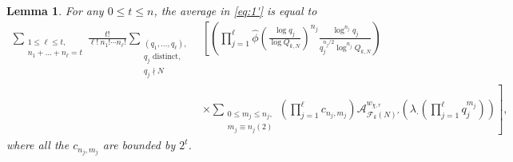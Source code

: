 \documentclass[12pt, reqno,oneside]{amsart}
\theoremstyle{plain}
\newtheorem{lemma}[theorem]{Lemma}
\theoremstyle{definition}
\theoremstyle{remark}
\theoremstyle{plain}
\numberwithin{equation}{section}
\begin{document}
\begin{lemma}\label{lemma:explicit-formula}
For any $0\leq t\leq n$, the average in \eqref{eq:1'} is equal to
\begin{align}
\nonumber
\sum_{\substack{1\leq\ell\leq t, \\ n_1+\dots+n_\ell=t}}\frac{t!}{\ell! \ n_1!\cdots n_\ell!}\sum_{\substack{(q_1,\dots,q_\ell), \\ q_j \text{ distinct},\\ q_j\nmid N}}&\left[\left(\prod_{j=1}^\ell\widehat{\phi}\left(\frac{\log q_j}{\log Q_{k,N}}\right)^{n_j}\frac{\log^{n_j} q_j}{q_j^{n_j/2}\log^{n_j} Q_{k,N}}\right)\right. \\ 
\label{eq:4'}
&\left.\times\sum_{\substack{0\leq m_j\leq n_j, \\ m_j\equiv n_j(2)}}\left(\prod_{j=1}^\ell c_{n_j,m_j}\right)\mathcal{A}^{w_{\chi,r}}_{\mathcal{F}_k(N)'}\left(\lambda_\cdot\left(\prod\nolimits_{j=1}^\ell q_j^{m_j}\right)\right)\right],
\end{align}
where all the $c_{n_j,m_j}$ are bounded by $2^t$.
\end{lemma}
\end{document}
